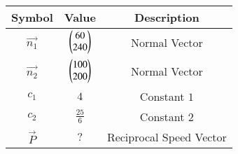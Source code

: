 \begin{tabular}{|c|c|c|}
     \hline
     \textbf{Symbol}& \textbf{Value} & \textbf{Description} \\
     \hline
     $\vec{n_1}$ & $\begin{pmatrix}60 \\ 240 \end{pmatrix}$ & Normal Vector \\ 
     \hline
		 $\vec{n_2}$  & $\begin{pmatrix}100 \\ 200 \end{pmatrix}$ & Normal Vector \\ 
     \hline
     $c_1$ & $4$ & Constant $1$ \\ 
     \hline
     $c_2$ & $\frac{25}{6}$ & Constant $2$ \\ 
     \hline
     $\vec{P}$ & $?$ & Reciprocal Speed Vector \\ 
     \hline
     
\end{tabular}
